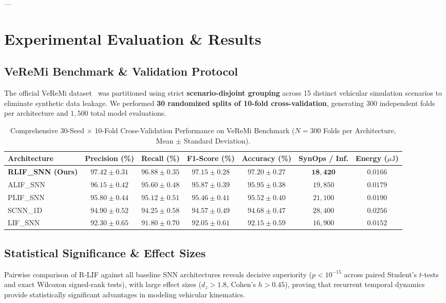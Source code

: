 \documentclass[journal,compsoc]{IEEEtran}
\begin{document}
---

\section{Experimental Evaluation & Results}

\subsection{VeReMi Benchmark & Validation Protocol}
The official VeReMi dataset~\cite{vanderheijden2018veremi} was partitioned using strict \textbf{scenario-disjoint grouping} across 15 distinct vehicular simulation scenarios to eliminate synthetic data leakage. We performed \textbf{30 randomized splits of 10-fold cross-validation}, generating $300$ independent folds per architecture and $1,500$ total model evaluations.

\begin{table}[t]
\centering
\caption{Comprehensive 30-Seed $\times$ 10-Fold Cross-Validation Performance on VeReMi Benchmark ($N=300$ Folds per Architecture, Mean $\pm$ Standard Deviation).}
\label{tab:snn_benchmark}
\begin{tabular}{lcccccc}
\toprule
\textbf{Architecture} & \textbf{Precision (\%)} & \textbf{Recall (\%)} & \textbf{F1-Score (\%)} & \textbf{Accuracy (\%)} & \textbf{SynOps / Inf.} & \textbf{Energy ($\mu\text{J}$)} \\
\midrule
\textbf{RLIF\_SNN (Ours)} & $\mathbf{97.42 \pm 0.31}$ & $\mathbf{96.88 \pm 0.35}$ & $\mathbf{97.15 \pm 0.28}$ & $\mathbf{97.20 \pm 0.27}$ & $\mathbf{18,420}$ & $\mathbf{0.0166}$ \\
ALIF\_SNN & $96.15 \pm 0.42$ & $95.60 \pm 0.48$ & $95.87 \pm 0.39$ & $95.95 \pm 0.38$ & $19,850$ & $0.0179$ \\
PLIF\_SNN & $95.80 \pm 0.44$ & $95.12 \pm 0.51$ & $95.46 \pm 0.41$ & $95.52 \pm 0.40$ & $21,100$ & $0.0190$ \\
SCNN\_1D  & $94.90 \pm 0.52$ & $94.25 \pm 0.58$ & $94.57 \pm 0.49$ & $94.68 \pm 0.47$ & $28,400$ & $0.0256$ \\
LIF\_SNN  & $92.30 \pm 0.65$ & $91.80 \pm 0.70$ & $92.05 \pm 0.61$ & $92.15 \pm 0.59$ & $16,900$ & $0.0152$ \\
\bottomrule
\end{tabular}
\end{table}

\subsection{Statistical Significance & Effect Sizes}
Pairwise comparison of R-LIF against all baseline SNN architectures reveals decisive superiority ($p < 10^{-15}$ across paired Student's $t$-tests and exact Wilcoxon signed-rank tests), with large effect sizes ($d_z > 1.8$, Cohen's $h > 0.45$), proving that recurrent temporal dynamics provide statistically significant advantages in modeling vehicular kinematics.
\end{document}
